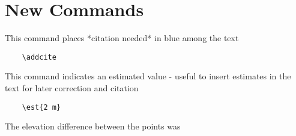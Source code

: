 \documentclass[../main.tex]{subfiles}
\begin{document}
\section{New Commands}
This command places *citation needed* in blue among the text
\begin{verbatim}
    \addcite
\end{verbatim}
\addcite


This command indicates an estimated value - useful to insert estimates in the text for later correction and citation
\begin{verbatim}
    \est{2 m}
\end{verbatim}
The elevation difference between the points was 


\end{document}
